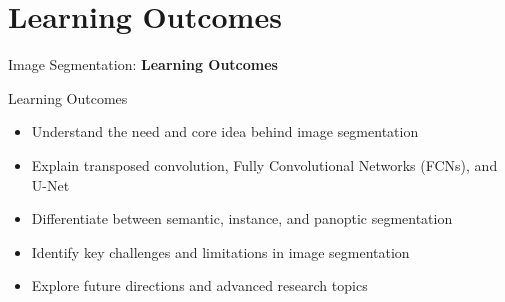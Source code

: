 \section{Learning Outcomes}
\begin{frame}{}
    \LARGE Image Segmentation: \textbf{Learning Outcomes}
\end{frame}

\begin{frame}{Learning Outcomes}
    \begin{itemize}
        \item Understand the need and core idea behind image segmentation
        \item Explain transposed convolution, Fully Convolutional Networks (FCNs), and U-Net
        \item Differentiate between semantic, instance, and panoptic segmentation
        \item Identify key challenges and limitations in image segmentation
        \item Explore future directions and advanced research topics
    \end{itemize}
\end{frame}